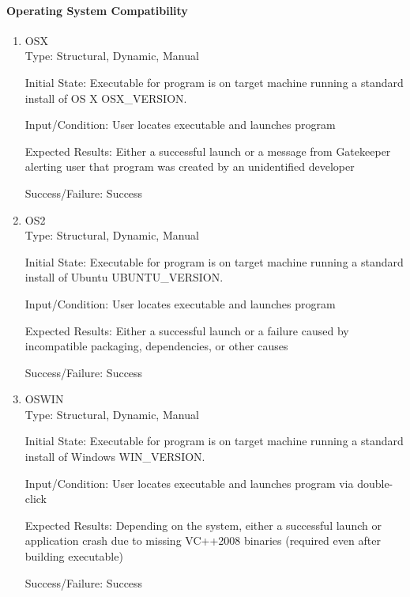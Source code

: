 \documentclass[12pt, titlepage]{article}
\begin{document}
	\paragraph{Operating System Compatibility}
	\begin{enumerate}
		\item{OSX\\}
		Type: Structural, Dynamic, Manual
		
		Initial State: Executable for program is on target machine running a
		standard install of OS X OSX\_VERSION.
		
		Input/Condition: User locates executable and launches program
		
		Expected Results: Either a successful launch or a message from Gatekeeper
		alerting user that program was created by an unidentified developer

		Success/Failure: Success
		
		\item{OS2\\}
		Type: Structural, Dynamic, Manual
		
		Initial State: Executable for program is on target machine running a
		standard install of Ubuntu UBUNTU\_VERSION.
		
		Input/Condition: User locates executable and launches program
		
		Expected Results: Either a successful launch or a failure caused by incompatible
		packaging, dependencies, or other causes

		Success/Failure: Success

		\item{OSWIN\\}
		Type: Structural, Dynamic, Manual
		
		Initial State: Executable for program is on target machine running a
		standard install of Windows WIN\_VERSION.
		
		Input/Condition: User locates executable and launches program via double-click
		
		Expected Results: Depending on the system, either a successful launch or
		application crash due to missing VC++2008 binaries (required even after 
		building executable)

		Success/Failure: Success
	\end{enumerate}
\end{document}
